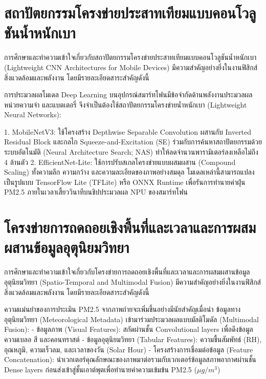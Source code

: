 
\section{สถาปัตยกรรมโครงข่ายประสาทเทียมแบบคอนโวลูชันน้ำหนักเบา}

การศึกษาและทำความเข้าใจเกี่ยวกับสถาปัตยกรรมโครงข่ายประสาทเทียมแบบคอนโวลูชันน้ำหนักเบา (Lightweight CNN Architectures for Mobile Devices) มีความสำคัญอย่างยิ่งในงานฟิสิกส์สิ่งแวดล้อมและพลังงาน โดยมีรายละเอียดสาระสำคัญดังนี้

การประมวลผลโมเดล Deep Learning บนอุปกรณ์สมาร์ทโฟนมีข้อจำกัดด้านพลังงานประมวลผล หน่วยความจำ และแบตเตอรี่ จึงจำเป็นต้องใช้สถาปัตยกรรมโครงข่ายน้ำหนักเบา (Lightweight Neural Networks):

1. MobileNetV3: ใช้โครงสร้าง Depthwise Separable Convolution ผสานกับ Inverted Residual Block และกลไก Squeeze-and-Excitation (SE) ร่วมกับการค้นหาสถาปัตยกรรมด้วยระบบอัตโนมัติ (Neural Architecture Search; NAS) ทำให้ลดจำนวนพารามิเตอร์ลงเหลือไม่ถึง 4 ล้านตัว
2. EfficientNet-Lite: ใช้การปรับสเกลโครงข่ายแบบผสมผสาน (Compound Scaling) ทั้งความลึก ความกว้าง และความละเอียดของภาพอย่างสมดุล
โมเดลเหล่านี้สามารถแปลงเป็นรูปแบบ TensorFlow Lite (TFLite) หรือ ONNX Runtime เพื่อรันการทำนายค่าฝุ่น PM2.5 ภายในเวลาเสี้ยววินาทีบนชิปประมวลผล NPU ของสมาร์ทโฟน

\section{โครงข่ายการถดถอยเชิงพื้นที่และเวลาและการผสมผสานข้อมูลอุตุนิยมวิทยา}

การศึกษาและทำความเข้าใจเกี่ยวกับโครงข่ายการถดถอยเชิงพื้นที่และเวลาและการผสมผสานข้อมูลอุตุนิยมวิทยา (Spatio-Temporal and Multimodal Fusion) มีความสำคัญอย่างยิ่งในงานฟิสิกส์สิ่งแวดล้อมและพลังงาน โดยมีรายละเอียดสาระสำคัญดังนี้

ความแม่นยำของการประเมิน PM2.5 จากภาพถ่ายจะเพิ่มขึ้นอย่างมีนัยสำคัญเมื่อนำ ข้อมูลทางอุตุนิยมวิทยา (Meteorological Metadata) เข้ามาร่วมประมวลผลแบบมัลติโมดัล (Multimodal Fusion):
- ข้อมูลภาพ (Visual Features): สกัดผ่านชั้น Convolutional layers เพื่อดึงข้อมูลความเบลอ สี และคอนทราสต์
- ข้อมูลอุตุนิยมวิทยา (Tabular Features): ความชื้นสัมพัทธ์ (RH), อุณหภูมิ, ความเร็วลม, และเวลาของวัน (Solar Hour)
- โครงสร้างการเชื่อมต่อข้อมูล (Feature Concatenation): นำเวกเตอร์คุณลักษณะของภาพมาต่อรวมกับเวกเตอร์ข้อมูลสภาพอากาศผ่านชั้น Dense layers ก่อนส่งเข้าสู่ชั้นเอาต์พุตเพื่อทำนายค่าความเข้มข้น PM2.5 ($\mu g/m^3$)

